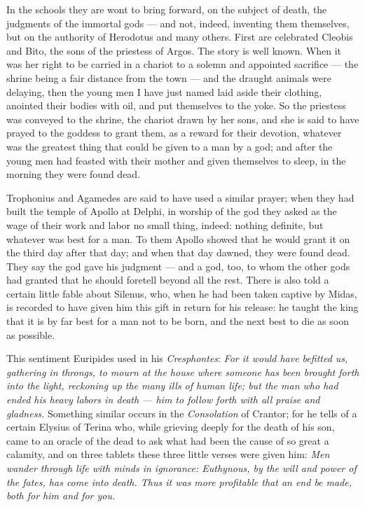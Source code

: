  In the schools they are wont to bring forward, on the subject of death, the judgments of the immortal gods — and not, indeed, inventing them themselves, but on the authority of Herodotus and many others. First are celebrated Cleobis and Bito, the sons of the priestess of Argos. The story is well known. When it was her right to be carried in a chariot to a solemn and appointed sacrifice — the shrine being a fair distance from the town — and the draught animals were delaying, then the young men I have just named laid aside their clothing, anointed their bodies with oil, and put themselves to the yoke. So the priestess was conveyed to the shrine, the chariot drawn by her sons, and she is said to have prayed to the goddess to grant them, as a reward for their devotion, whatever was the greatest thing that could be given to a man by a god; and after the young men had feasted with their mother and given themselves to sleep, in the morning they were found dead.

 Trophonius and Agamedes are said to have used a similar prayer; when they had built the temple of Apollo at Delphi, in worship of the god they asked as the wage of their work and labor no small thing, indeed: nothing definite, but whatever was best for a man. To them Apollo showed that he would grant it on the third day after that day; and when that day dawned, they were found dead. They say the god gave his judgment — and a god, too, to whom the other gods had granted that he should foretell beyond all the rest. There is also told a certain little fable about Silenus, who, when he had been taken captive by Midas, is recorded to have given him this gift in return for his release: he taught the king that it is by far best for a man not to be born, and the next best to die as soon as possible.

 This sentiment Euripides used in his \textit{Cresphontes}: \textit{For it would have befitted us, gathering in throngs, to mourn at the house where someone has been brought forth into the light, reckoning up the many ills of human life; but the man who had ended his heavy labors in death — him to follow forth with all praise and gladness.} Something similar occurs in the \textit{Consolation} of Crantor; for he tells of a certain Elysius of Terina who, while grieving deeply for the death of his son, came to an oracle of the dead to ask what had been the cause of so great a calamity, and on three tablets these three little verses were given him: \textit{Men wander through life with minds in ignorance: Euthynous, by the will and power of the fates, has come into death. Thus it was more profitable that an end be made, both for him and for you.}

